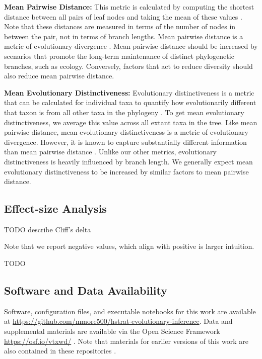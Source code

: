 \textbf{Mean Pairwise Distance:}
This metric is calculated by computing the shortest distance between all pairs of leaf nodes and taking the mean of these values \citep{webbExploringPhylogeneticStructure2000}.
Note that these distances are measured in terms of the number of nodes in between the pair, not in terms of branch lengths.
Mean pairwise distance is a metric of evolutionary divergence \citep{tuckerGuidePhylogeneticMetrics2017}.
Mean pairwise distance should be increased by scenarios that promote the long-term maintenance of distinct phylogenetic branches, such as ecology.
Conversely, factors that act to reduce diversity should also reduce mean pairwise distance.

\textbf{Mean Evolutionary Distinctiveness:}
Evolutionary distinctiveness is a metric that can be calculated for individual taxa to quantify how evolutionarily different that taxon is from all other taxa in the phylogeny \citep{isaacMammalsEDGEConservation2007}.
To get mean evolutionary distinctiveness, we average this value across all extant taxa in the tree.
Like mean pairwise distance, mean evolutionary distinctiveness is a metric of evolutionary divergence.
However, it is known to capture substantially different information than mean pairwise distance \citep{tuckerGuidePhylogeneticMetrics2017}.
Unlike our other metrics, evolutionary distinctiveness is heavily influenced by branch length.
We generally expect mean evolutionary distinctiveness to be increased by similar factors to mean pairwise distance.

\subsection{Effect-size Analysis}

TODO describe Cliff's delta
\citep{meissel2024using,cliff1993dominance}

Note that we report negative values, which align with positive is larger intuition.

TODO \citep{mann1947on}

\subsection{Software and Data Availability}

Software, configuration files, and executable notebooks for this work are available at \url{https://github.com/mmore500/hstrat-evolutionary-inference}.
Data and supplemental materials are available via the Open Science Framework \url{https://osf.io/vtxwd/} \citep{foster2017open}.
Note that materials for earlier versions of this work are also contained in these repositories \citep{moreno2023toward}.

